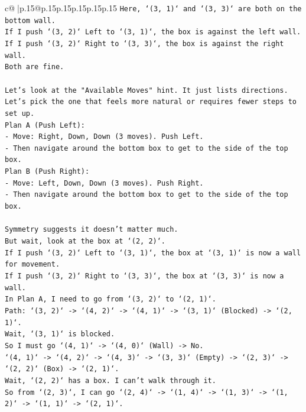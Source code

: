 \documentclass{article}
\begin{document}
{\begin{supertabular}{c@{$\;$}|p{.15\linewidth}@{}p{.15\linewidth}p{.15\linewidth}p{.15\linewidth}p{.15\linewidth}p{.15\linewidth}}
{{{\texttt{Here, `(3, 1)` and `(3, 3)` are both on the bottom wall.} \\
\texttt{If I push `(3, 2)` Left to `(3, 1)`, the box is against the left wall.} \\
\texttt{If I push `(3, 2)` Right to `(3, 3)`, the box is against the right wall.} \\
\texttt{Both are fine.} \\
\\ 
\texttt{Let's look at the "Available Moves" hint. It just lists directions.} \\
\texttt{Let's pick the one that feels more natural or requires fewer steps to set up.} \\
\texttt{Plan A (Push Left):} \\
\texttt{{-} Move: Right, Down, Down (3 moves). Push Left.} \\
\texttt{{-} Then navigate around the bottom box to get to the side of the top box.} \\
\texttt{Plan B (Push Right):} \\
\texttt{{-} Move: Left, Down, Down (3 moves). Push Right.} \\
\texttt{{-} Then navigate around the bottom box to get to the side of the top box.} \\
\\ 
\texttt{Symmetry suggests it doesn't matter much.} \\
\texttt{But wait, look at the box at `(2, 2)`.} \\
\texttt{If I push `(3, 2)` Left to `(3, 1)`, the box at `(3, 1)` is now a wall for movement.} \\
\texttt{If I push `(3, 2)` Right to `(3, 3)`, the box at `(3, 3)` is now a wall.} \\
\texttt{In Plan A, I need to go from `(3, 2)` to `(2, 1)`.} \\
\texttt{Path: `(3, 2)` {-}> `(4, 2)` {-}> `(4, 1)` {-}> `(3, 1)` (Blocked) {-}> `(2, 1)`.} \\
\texttt{Wait, `(3, 1)` is blocked.} \\
\texttt{So I must go `(4, 1)` {-}> `(4, 0)` (Wall) {-}> No.} \\
\texttt{`(4, 1)` {-}> `(4, 2)` {-}> `(4, 3)` {-}> `(3, 3)` (Empty) {-}> `(2, 3)` {-}> `(2, 2)` (Box) {-}> `(2, 1)`.} \\
\texttt{Wait, `(2, 2)` has a box. I can't walk through it.} \\
\texttt{So from `(2, 3)`, I can go `(2, 4)` {-}> `(1, 4)` {-}> `(1, 3)` {-}> `(1, 2)` {-}> `(1, 1)` {-}> `(2, 1)`.} \\
}}}
\end{supertabular}}
\end{document}
